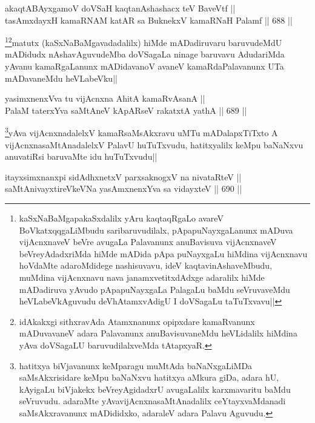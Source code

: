 
\begin{shl}
akaqtABAyxgamoV doVSaH kaqtanAshashacx teV BaveVtf || \\
tasAmxdayxH kamaRNAM katAR sa BuknekxV kamaRNaH Palamf ||  688 ||  
\end{shl}

\begin{artha}
\footnote{kaSxNaBaMgapakaSxdalilx yAru kaqtaqRgaLo avareV BoVkatxqqgaLiMbudu saribaruvudilalx, pApapuNayxgaLanunx mADuva vijAcnxnaveV beVre avugaLa Palavanunx anuBavisuva vijAcnxnaveV beVreyAdadxriMda hiMde mADida pApa puNayxgaLu hiMdina vijAcnxnavu hoVdaMte adaroMdidege nashisuvavu, ideV kaqtavinAshaveMbudu, muMdina vijAcnxnavu nava janamxvetitxdAdxge adaralilx hiMde mADadiruva yAvudo pApapuNayxgaLa PalagaLu baMdu seVruvaveMdu heVLabeVkAguvudu deVhAtamxvAdigU I doVSagaLu taTuTxvavu||}\footnote{idAkakxgi sithxravAda Atamxnanunx opipxdare kamaRvanunx mADuvavaneV adara Palavanunx anuBavisuvaneMdu heVLidalilx hiMdina yAva doVSagaLU baruvudilalxveMda tAtapxyaR.}matutx (kaSxNaBaMgavadadalilx) hiMde mADadiruvaru baruvudeMdU mADidudx nAshavAguvudeMba doVSagaLa ninage baruvavu AdudariMda yAvanu kamaRgaLanunx mADidavanoV avaneV kamaRdaPalavanunx UTa mADavaneMdu heVLabeVku||
\end{artha}



\begin{shl}
yasimxnenxVva tu vijAcnxna AhitA kamaRvAsanA || \\
PalaM taterxYva saMtAneV kApARseV rakatxtA yathA ||  689 ||  
\end{shl}

\begin{artha}
\footnote{hatitxya biVjavanunx keMparagu muMtAda baNaNxgaLiMDa saMsAkxrisidare keMpu baNaNxvu  hatitxya aMkura giDa, adara hU, kAyigaLu biVjakekx beVreyAgidadxrU avugaLalilx karxmavaritu baMdu seVruvudu. adaraMte yAvavijAcnxnasaMtAnadalilx ceYtayxvaMdanadi saMsAkxravanunx mADididxko, adaraleV adara Palavu Aguvudu.}yAva vijAcnxnadalelxV kamaRsaMsAkxravu uMTu mADalapxTiTxto A vijAcnxnasaMtAnadalelxV PalavU huTuTxvudu, hatitxyalilx keMpu baNaNxvu anuvatiRsi baruvaMte idu huTuTxvudu||
\end{artha}


\begin{shl}
itayxsimxnanxpi sidAdhxnetxV parxsaknogxV na nivataRteV || \\
saMtAnivayxtireVkeVNa yasAmxnenxYva sa vidayxteV ||  690 ||  
\end{shl}

